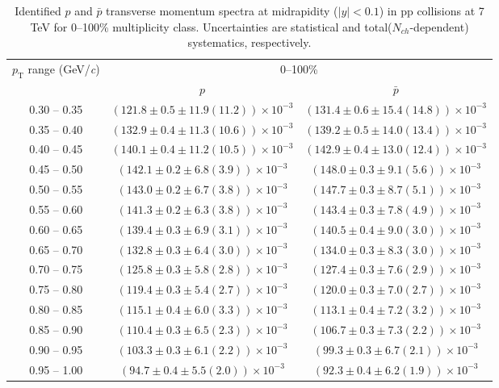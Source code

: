 \clearpage
\begin{table}
\caption{Identified $p$ and $\bar{p}$  transverse momentum spectra at midrapidity ($|y|<0.1$) in pp collisions at 7 TeV for 0--100\% multiplicity class. Uncertainties are statistical and total($N_{ch}$-dependent) systematics, respectively.}
\label{tab:ProtonPlus_ProtonMinus_0to100}
\begin{center}
\begin{tabular}{ c | c c }
\hline
\multirow{2}{*}{$p_{\mathrm{T}}$ range (GeV/\textit{c})} & \multicolumn{2}{c}{0--100\%} \\ & $p$& $\bar{p}$\\ 
\hline
0.30 -- 0.35 & $(121.8\pm0.5\pm11.9(11.2))\times10^{-3}$ & $(131.4\pm0.6\pm15.4(14.8))\times10^{-3}$ \\ 
0.35 -- 0.40 & $(132.9\pm0.4\pm11.3(10.6))\times10^{-3}$ & $(139.2\pm0.5\pm14.0(13.4))\times10^{-3}$ \\ 
0.40 -- 0.45 & $(140.1\pm0.4\pm11.2(10.5))\times10^{-3}$ & $(142.9\pm0.4\pm13.0(12.4))\times10^{-3}$ \\ 
0.45 -- 0.50 & $(142.1\pm0.2\pm6.8(3.9))\times10^{-3}$ & $(148.0\pm0.3\pm9.1(5.6))\times10^{-3}$ \\ 
0.50 -- 0.55 & $(143.0\pm0.2\pm6.7(3.8))\times10^{-3}$ & $(147.7\pm0.3\pm8.7(5.1))\times10^{-3}$ \\ 
0.55 -- 0.60 & $(141.3\pm0.2\pm6.3(3.8))\times10^{-3}$ & $(143.4\pm0.3\pm7.8(4.9))\times10^{-3}$ \\ 
0.60 -- 0.65 & $(139.4\pm0.3\pm6.9(3.1))\times10^{-3}$ & $(140.5\pm0.4\pm9.0(3.0))\times10^{-3}$ \\ 
0.65 -- 0.70 & $(132.8\pm0.3\pm6.4(3.0))\times10^{-3}$ & $(134.0\pm0.3\pm8.3(3.0))\times10^{-3}$ \\ 
0.70 -- 0.75 & $(125.8\pm0.3\pm5.8(2.8))\times10^{-3}$ & $(127.4\pm0.3\pm7.6(2.9))\times10^{-3}$ \\ 
0.75 -- 0.80 & $(119.4\pm0.3\pm5.4(2.7))\times10^{-3}$ & $(120.0\pm0.3\pm7.0(2.7))\times10^{-3}$ \\ 
0.80 -- 0.85 & $(115.1\pm0.4\pm6.0(3.3))\times10^{-3}$ & $(113.1\pm0.4\pm7.2(3.2))\times10^{-3}$ \\ 
0.85 -- 0.90 & $(110.4\pm0.3\pm6.5(2.3))\times10^{-3}$ & $(106.7\pm0.3\pm7.3(2.2))\times10^{-3}$ \\ 
0.90 -- 0.95 & $(103.3\pm0.3\pm6.1(2.2))\times10^{-3}$ & $(99.3\pm0.3\pm6.7(2.1))\times10^{-3}$ \\ 
0.95 -- 1.00 & $(94.7\pm0.4\pm5.5(2.0))\times10^{-3}$ & $(92.3\pm0.4\pm6.2(1.9))\times10^{-3}$ \\ 

\end{tabular}
\end{center}
\end{table}
